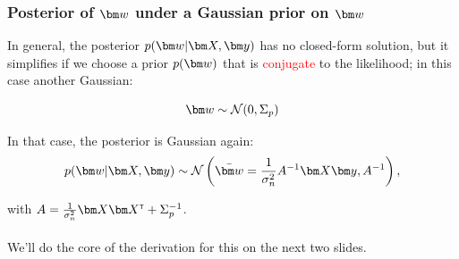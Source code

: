 
\begin{frame}
\frametitle{Posterior of $\bw$ under a Gaussian prior on $\bw$}

In general, the posterior $p(\bw|\bX, \by)$ has no closed-form solution, but 
it simplifies if we choose a prior $p(\bw)$ that is \textcolor{red}{conjugate} to the likelihood; in this case another Gaussian:

\renewcommand\theequation{2.\thedefcounter}
\setcounter{defcounter}{4}
\begin{equation}
\bw \sim \norm(0, \Sigma_p)
\end{equation}

In that case, the posterior is Gaussian again:
\setcounter{defcounter}{7}
\begin{equation}
p(\bw|\bX, \by) \sim \norm\left(\bar{\bw} = \frac{1}{\sigma_n^2}A\inv \bX\by, A\inv\right)
\label{eq:posterior_2_7},
\end{equation}

with $A = \frac{1}{\sigma_n^2} \bX \bX\transpose + \Sigma_p^{-1}$.\\~\\

We'll do the core of the derivation for this on the next two slides.



\end{frame}

%
%
%
%
%
%


